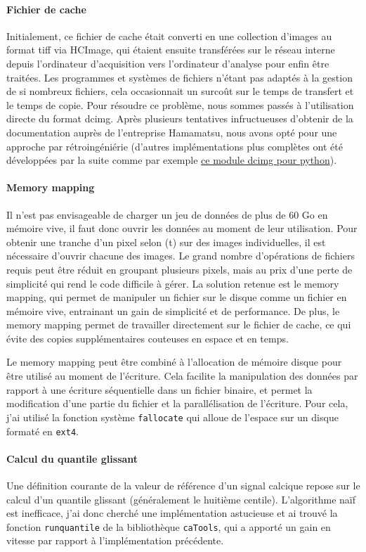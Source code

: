 \paragraph{Fichier de cache}
Initialement, ce fichier de cache était converti en une collection d'images au format tiff via HCImage, qui étaient ensuite transférées sur le réseau interne depuis l'ordinateur d'acquisition vers l'ordinateur d'analyse pour enfin être traitées. Les programmes et systèmes de fichiers n'étant pas adaptés à la gestion de si nombreux fichiers, cela occasionnait un surcoût sur le temps de transfert et le temps de copie. Pour résoudre ce problème, nous sommes passés à l'utilisation directe du format dcimg. Après plusieurs tentatives infructueuses d'obtenir de la documentation auprès de l'entreprise Hamamatsu, nous avons opté pour une approche par rétroingéniérie (d'autres implémentations plus complètes ont été développées par la suite comme par exemple \href{https://github.com/lens-biophotonics/dcimg}{ce module dcimg pour python}).

\paragraph{Memory mapping}
Il n'est pas envisageable de charger un jeu de données de plus de 60 Go en mémoire vive, il faut donc ouvrir les données au moment de leur utilisation. Pour obtenir une tranche d'un pixel selon (t) sur des images individuelles, il est nécessaire d'ouvrir chacune des images. Le grand nombre d'opérations de fichiers requis peut être réduit en groupant plusieurs pixels, mais au prix d'une perte de simplicité qui rend le code difficile à gérer. La solution retenue est le memory mapping, qui permet de manipuler un fichier sur le disque comme un fichier en mémoire vive, entrainant un gain de simplicité et de performance. De plus, le memory mapping permet de travailler directement sur le fichier de cache, ce qui évite des copies supplémentaires couteuses en espace et en temps.

Le memory mapping peut être combiné à l'allocation de mémoire disque pour être utilisé au moment de l'écriture. Cela facilite la manipulation des données par rapport à une écriture séquentielle dans un fichier binaire, et permet la modification d'une partie du fichier et la parallélisation de l'écriture. Pour cela, j'ai utilisé la fonction système \verb|fallocate| qui alloue de l'espace sur un disque formaté en \verb|ext4|.

\paragraph{Calcul du quantile glissant}
Une définition courante de la valeur de référence d'un signal calcique repose sur le calcul d'un quantile glissant (généralement le huitième centile). L'algorithme naïf est inefficace, j'ai donc cherché une implémentation astucieuse et ai trouvé la fonction \verb|runquantile| de la bibliothèque \verb|caTools|, qui a apporté un gain en vitesse par rapport à l'implémentation précédente.

